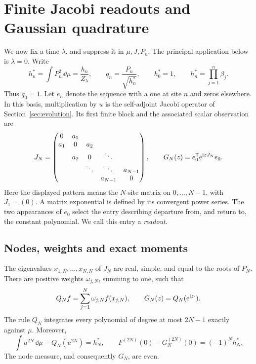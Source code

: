 \section{Finite Jacobi readouts and Gaussian quadrature}
\label{sec:readouts}

We now fix a time \(\lambda\), and suppress it in \(\mu,J,P_n\).
The principal application below is \(\lambda=0\). Write
\begin{equation}
 h_n^*=\int P_n^2\,\dd\mu=\frac{h_n}{Z_\lambda},\qquad
 q_n=\frac{P_n}{\sqrt{h_n^*}},\qquad
 h_0^*=1,\qquad h_n^*=\prod_{j=1}^n\beta_j.
 \label{eq:probabilitynorm}
\end{equation}
Thus \(q_0=1\). Let \(e_n\) denote the sequence with a one at site
\(n\) and zeros elsewhere. In this basis, multiplication by \(u\)
is the self-adjoint Jacobi operator of Section~\ref{sec:evolution}.
Its first finite block and the associated scalar observation are
\begin{equation}
 J_N=\begin{pmatrix}
 0&a_1&&&\\a_1&0&a_2&&\\&a_2&0&\ddots&\\
 &&\ddots&\ddots&a_{N-1}\\&&&a_{N-1}&0
 \end{pmatrix},\qquad
 G_N(z)=e_0^{\mathsf T}\mathrm e^{\mathrm i zJ_N}e_0.
 \label{eq:finite-readout}
\end{equation}
Here the displayed pattern means the \(N\)-site matrix on
\(0,\ldots,N-1\), with \(J_1=(0)\). A matrix exponential is defined
by its convergent power series. The two appearances of \(e_0\) select
the entry describing departure from, and return to, the constant
polynomial. We call this entry a \emph{readout}.

\subsection{Nodes, weights and exact moments}

\begin{proposition}
\label{prop:gauss}
The eigenvalues \(x_{1,N},\ldots,x_{N,N}\) of \(J_N\) are real,
simple, and equal to the roots of \(P_N\). There are positive weights
\(\omega_{j,N}\), summing to one, such that
\begin{equation}
 Q_N f=\sum_{j=1}^N\omega_{j,N}f(x_{j,N}),\qquad
 G_N(z)=Q_N(\mathrm e^{\mathrm i z\cdot}).
 \label{eq:gauss-readout}
\end{equation}
The rule \(Q_N\) integrates every polynomial of degree at most
\(2N-1\) exactly against \(\mu\). Moreover,
\begin{equation}
 \int u^{2N}\,\dd\mu-Q_N(u^{2N})=h_N^*,\qquad
 F^{(2N)}(0)-G_N^{(2N)}(0)=(-1)^Nh_N^*.
 \label{eq:first-walk}
\end{equation}
The node measure, and consequently \(G_N\), are even.
\end{proposition}

